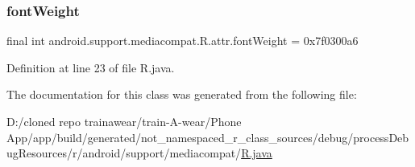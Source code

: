 \subsubsection{\texorpdfstring{fontWeight}{fontWeight}}
{\footnotesize\ttfamily final int android.\+support.\+mediacompat.\+R.\+attr.\+font\+Weight = 0x7f0300a6\hspace{0.3cm}{\ttfamily [static]}}



Definition at line 23 of file R.\+java.



The documentation for this class was generated from the following file\+:\begin{DoxyCompactItemize}
\item 
D\+:/cloned repo trainawear/train-\/\+A-\/wear/\+Phone App/app/build/generated/not\+\_\+namespaced\+\_\+r\+\_\+class\+\_\+sources/debug/process\+Debug\+Resources/r/android/support/mediacompat/\mbox{\hyperlink{process_debug_resources_2r_2android_2support_2mediacompat_2_r_8java}{R.\+java}}\end{DoxyCompactItemize}
